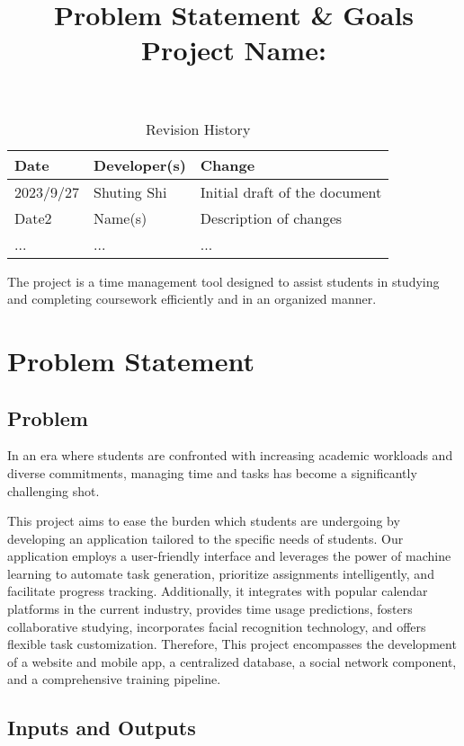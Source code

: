 \documentclass{article}
\title{\textbf{Problem Statement \& Goals}\\\textbf{Project Name: \progname}}
\author{\authname}
\date{}
\begin{document}
\maketitle

\begin{table}[hp]
\caption{Revision History} \label{TblRevisionHistory}
\begin{tabularx}{\textwidth}{llX}
\toprule
\textbf{Date} & \textbf{Developer(s)} & \textbf{Change}\\
\midrule
2023/9/27 & Shuting Shi  &  Initial draft of the document\\
Date2 & Name(s) & Description of changes\\
... & ... & ...\\
\bottomrule
\end{tabularx}
\end{table}

The project is a time management tool designed to assist students in studying and completing coursework efficiently and in an organized manner.

\section{Problem Statement}

\subsection{Problem}

    In an era where students are confronted with increasing academic workloads and diverse commitments, managing time and tasks has become a significantly challenging shot.

    This project aims to ease the burden which students are undergoing by developing an application tailored to the specific needs of students. Our application employs a user-friendly interface and leverages the power of machine learning to automate task generation, prioritize assignments intelligently, and facilitate progress tracking. Additionally, it integrates with popular calendar platforms in the current industry, provides time usage predictions, fosters collaborative studying, incorporates facial recognition technology, and offers flexible task customization. Therefore, This project encompasses the development of a website and mobile app, a centralized database, a social network component, and a comprehensive training pipeline.
\subsection{Inputs and Outputs}
\end{document}
